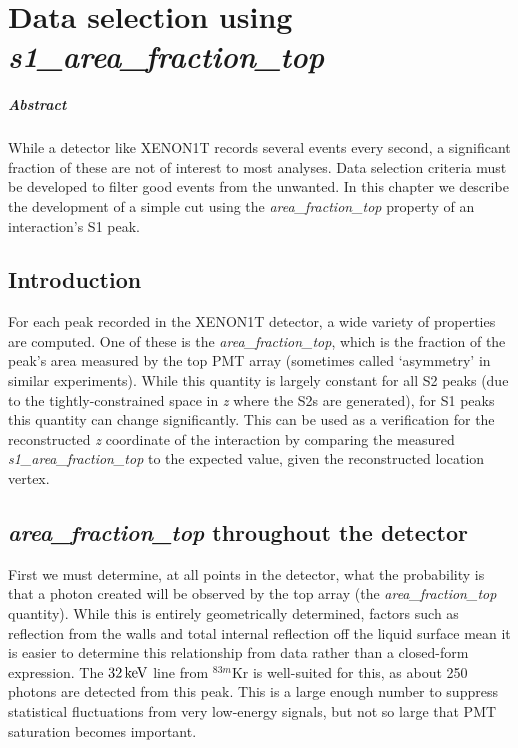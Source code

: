 
\chapter{Data selection using \textit{s1\_area\_fraction\_top}}\label{app:s1aft}

\paragraph{Abstract} While a detector like XENON1T records several events every second, a significant fraction of these are not of interest to most analyses. Data selection criteria must be developed to filter good events from the unwanted. In this chapter we describe the development of a simple cut using the \textit{area\_fraction\_top} property of an interaction's S1 peak.

\section{Introduction}

For each peak recorded in the XENON1T detector, a wide variety of properties are computed. One of these is the \textit{area\_fraction\_top}, which is the fraction of the peak's area measured by the top PMT array (sometimes called `asymmetry' in similar experiments). While this quantity is largely constant for all S2 peaks (due to the tightly-constrained space in \textit{z} where the S2s are generated), for S1 peaks this quantity can change significantly. This can be used as a verification for the reconstructed \textit{z} coordinate of the interaction by comparing the measured \textit{s1\_area\_fraction\_top} to the expected value, given the reconstructed location vertex.

\section{\textit{area\_fraction\_top} throughout the detector}

First we must determine, at all points in the detector, what the probability is that a photon created will be observed by the top array (the \textit{area\_fraction\_top} quantity). While this is entirely geometrically determined, factors such as reflection from the walls and total internal reflection off the liquid surface mean it is easier to determine this relationship from data rather than a closed-form expression. The $32\,\mathrm{keV}$ line from $^{83m}$Kr is well-suited for this, as about 250 photons are detected from this peak. This is a large enough number to suppress statistical fluctuations from very low-energy signals, but not so large that PMT saturation becomes important.

